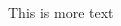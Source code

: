 \documentclass[12pt]{article}
\begin{document}
\begin{multicols}{2}
\begin{minipage}{0.4\columnwidth}
                \label{ham_wc}
             \end{minipage}
            This is more text



    \end{multicols}
\end{document}
